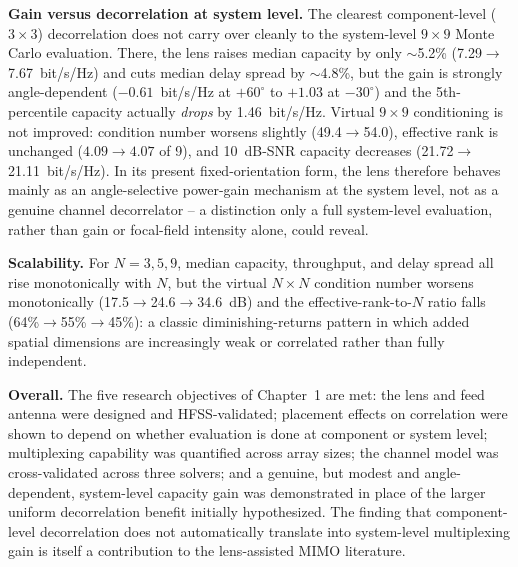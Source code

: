 \textbf{Gain versus decorrelation at system level.} The clearest component-level ($3\times3$) decorrelation does not carry over cleanly to the system-level $9\times9$ Monte Carlo evaluation. There, the lens raises median capacity by only $\sim$5.2\% (7.29$\to$7.67~bit/s/Hz) and cuts median delay spread by $\sim$4.8\%, but the gain is strongly angle-dependent ($-0.61$~bit/s/Hz at $+60^\circ$ to $+1.03$ at $-30^\circ$) and the 5th-percentile capacity actually \emph{drops} by 1.46~bit/s/Hz. Virtual $9\times9$ conditioning is not improved: condition number worsens slightly (49.4$\to$54.0), effective rank is unchanged ($4.09\to4.07$ of 9), and 10~dB-SNR capacity decreases (21.72$\to$21.11~bit/s/Hz). In its present fixed-orientation form, the lens therefore behaves mainly as an angle-selective power-gain mechanism at the system level, not as a genuine channel decorrelator -- a distinction only a full system-level evaluation, rather than gain or focal-field intensity alone, could reveal.

\textbf{Scalability.} For $N=3,5,9$, median capacity, throughput, and delay spread all rise monotonically with $N$, but the virtual $N\times N$ condition number worsens monotonically (17.5$\to$24.6$\to$34.6~dB) and the effective-rank-to-$N$ ratio falls (64\%$\to$55\%$\to$45\%): a classic diminishing-returns pattern in which added spatial dimensions are increasingly weak or correlated rather than fully independent.

\textbf{Overall.} The five research objectives of Chapter~1 are met: the lens and feed antenna were designed and HFSS-validated; placement effects on correlation were shown to depend on whether evaluation is done at component or system level; multiplexing capability was quantified across array sizes; the channel model was cross-validated across three solvers; and a genuine, but modest and angle-dependent, system-level capacity gain was demonstrated in place of the larger uniform decorrelation benefit initially hypothesized. The finding that component-level decorrelation does not automatically translate into system-level multiplexing gain is itself a contribution to the lens-assisted MIMO literature.

